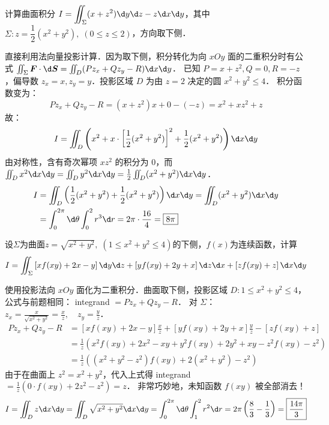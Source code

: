 \documentclass[12pt, a4paper, oneside, UTF8]{ctexbook}
\begin{document}
\begin{example}
    计算曲面积分 $I = \displaystyle\iint_\Sigma (x+z^2)\d y \d z - z \d x \d y$，其中 $\Sigma: z=\dfrac{1}{2}(x^2+y^2),\;(0\le z\le 2)$，方向取下侧． 
\end{example}
\begin{solution}
    直接利用法向量投影计算．因为取下侧，积分转化为向 $xOy$ 面的二重积分时有公式 $\iint_\Sigma \bm{F}\cdot\d\bm{S} = \iint_{D} (P z_x + Q z_y - R) \d x \d y$．
    已知 $P = x+z^2, Q = 0, R = -z$，偏导数 $z_x = x, z_y = y$．投影区域 $D$ 为由 $z=2$ 决定的圆 $x^2+y^2 \le 4$．
    积分函数变为：
    \[ P z_x + Q z_y - R = (x+z^2)x + 0 - (-z) = x^2 + xz^2 + z \]
    故：
    \[ I = \iint_D \left(x^2 + x \cdot \left[\frac{1}{2}(x^2+y^2)\right]^2 + \frac{1}{2}(x^2+y^2)\right) \d x \d y \]
    由对称性，含有奇次幂项 $x z^2$ 的积分为 0，而 $\iint_D x^2 \d x \d y = \iint_D y^2 \d x \d y = \frac{1}{2} \iint_D (x^2+y^2) \d x \d y$．
    \begin{align*}
        I &= \iint_D \left( \frac{1}{2} (x^2+y^2) + \frac{1}{2}(x^2+y^2) \right) \d x \d y = \iint_D (x^2+y^2) \d x \d y \\
        &= \int_0^{2\pi} \d\theta \int_0^2 r^3 \d r = 2\pi \cdot \frac{16}{4} = \boxed{8\pi}
    \end{align*}
\end{solution}
\begin{example}
    设$\Sigma$为曲面$z=\sqrt{x^2+y^2},\;(1\le x^2+y^2 \le 4)$的下侧，$f(x)$为连续函数，计算
    \[I=\iint_\Sigma\left[xf(xy)+2x-y\right]\d y\d z+\left[yf(xy)+2y+x\right]\d z\d x+\left[zf(xy)+z\right]\d x\d y\]
\end{example}
\begin{solution}
    使用投影法向 $xOy$ 面化为二重积分．曲面取下侧，投影区域 $D: 1 \le x^2+y^2 \le 4$，公式与前题相同： integrand $= P z_x + Q z_y - R$．
    对 $\Sigma$：$z_x = \frac{x}{\sqrt{x^2+y^2}} = \frac{x}{z}, \quad z_y = \frac{y}{z}$．
    \begin{align*}
        P z_x + Q z_y - R &= [xf(xy)+2x-y]\frac{x}{z} + [yf(xy)+2y+x]\frac{y}{z} - [zf(xy)+z] \\
        &= \frac{1}{z} \left( x^2f(xy) + 2x^2 - xy + y^2f(xy) + 2y^2 + xy - z^2f(xy) - z^2 \right) \\
        &= \frac{1}{z} \left( (x^2+y^2-z^2)f(xy) + 2(x^2+y^2) - z^2 \right)
    \end{align*}
    由于在曲面上 $z^2 = x^2+y^2$，代入上式得 integrand $= \frac{1}{z} (0 \cdot f(xy) + 2z^2 - z^2) = z$．
    非常巧妙地，未知函数 $f(xy)$ 被全部消去！
    \[ I = \iint_D z \d x \d y = \iint_D \sqrt{x^2+y^2} \d x \d y = \int_0^{2\pi} \d\theta \int_1^2 r^2 \d r = 2\pi \left( \frac{8}{3} - \frac{1}{3} \right) = \boxed{\frac{14\pi}{3}} \]
\end{solution}
\end{document}
